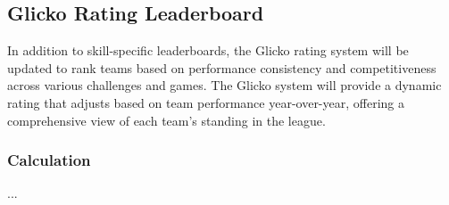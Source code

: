 \subsection{Glicko Rating Leaderboard}
In addition to skill-specific leaderboards, the Glicko rating system will be updated to rank teams based on
performance consistency and competitiveness across various challenges and games.
The Glicko system will provide a dynamic rating that adjusts based on team performance
year-over-year, offering a comprehensive view of each team's standing in the league.

\subsubsection{Calculation}
...
